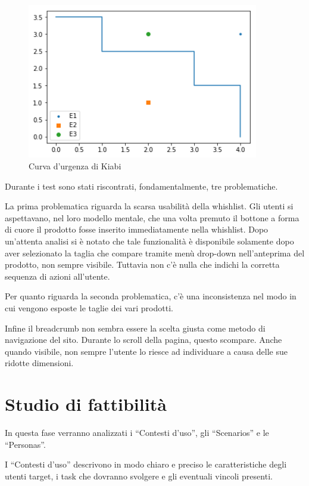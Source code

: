 \documentclass[12pt,italian,]{report}
\begin{document}
\begin{figure}[h]
\caption{Curva d'urgenza di Kiabi}
\includegraphics[width=0.90\textwidth]{img/curve_urgenza_kiabi}
\centering
\end{figure}

Durante i test sono stati riscontrati, fondamentalmente, tre problematiche.

La prima problematica riguarda la scarsa usabilità della whishlist. Gli utenti si aspettavano, nel loro modello mentale, che una volta premuto il bottone a forma di cuore il prodotto fosse inserito immediatamente nella whishlist. Dopo un'attenta analisi si è notato che tale funzionalità è disponibile solamente dopo aver selezionato la taglia che compare tramite menù drop-down nell'anteprima del prodotto, non sempre visibile. Tuttavia non c'è nulla che indichi la corretta sequenza di azioni all'utente.

Per quanto riguarda la seconda problematica, c'è una inconsistenza nel modo in cui vengono esposte le taglie dei vari prodotti.

Infine il breadcrumb non sembra essere la scelta giusta come metodo di navigazione del sito. Durante lo scroll della pagina, questo scompare. Anche quando visibile, non sempre l'utente lo riesce ad individuare a causa delle sue ridotte dimensioni.

\chapter{Studio di fattibilità}\label{studio-di-fattibilituxe0}

In questa fase verranno analizzati i ``Contesti d'uso'', gli
``Scenarios'' e le ``Personas''.

I ``Contesti d'uso'' descrivono in modo chiaro e preciso le
caratteristiche degli utenti target, i task che dovranno svolgere e
gli eventuali vincoli presenti.
\end{document}
